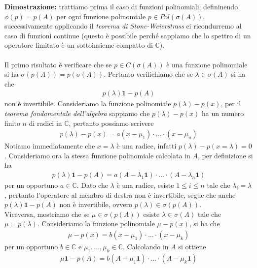 \documentclass{article}
\numberwithin{equation}{subsection}
\begin{document}
\textbf{Dimostrazione:} trattiamo prima il caso di funzioni polinomiali, defininendo $\phi(p) = p(A)$ per ogni funzione polinomiale $p \in Pol(\sigma(A))$, successivamente applicando il \textit{teorema di Stone-Weierstrass} ci ricondurremo al caso di funzioni continue (questo è possibile perché sappiamo che lo spettro di un operatore limitato è un sottoinsieme compatto di $\mathbb{C}$). \\ \\
Il primo risultato è verificare che se $p \in C(\sigma(A))$ è una funzione polinomiale si ha $\sigma(p(A)) = p(\sigma(A))$. Pertanto verifichiamo che se $\lambda \in \sigma(A)$ si ha che 
\begin{align*}
    p(\lambda)\mathbf{1} - p(A) 
\end{align*} 
non è invertibile. Consideriamo la funzione polinomiale $p(\lambda) - p(x)$, per il \textit{teorema fondamentale dell'algebra} sappiamo che $p(\lambda) - p(x)$ ha un numero finito $n$ di radici in $\mathbb{C}$, pertanto possiamo scrivere 
\begin{align*}
    p(\lambda) - p(x) = a(x - \mu_1) \cdot \dots \cdot (x - \mu_n) 
\end{align*}
Notiamo immediatamente che $x = \lambda$ è una radice, infatti $p(\lambda) - p(x = \lambda) = 0$. Consideriamo ora la stessa funzione polinomiale calcolata in $A$, per definizione si ha 
\begin{align*}
    p(\lambda)\mathbf{1} - p(A) = a(A - \lambda_1\mathbf{1}) \cdot \dots \cdot (A - \lambda_n\mathbf{1}) 
\end{align*}
per un opportuno $a \in \mathbb{C}$. Dato che $\lambda$ è una radice, esiste $1 \leq i \leq n$ tale che $\lambda_i = \lambda$, pertanto l'operatore al membro di destra non è invertibile, segue che anche $p(\lambda)\mathbf{1} - p(A)$ non è invertibile, ovvero $p(\lambda) \in \sigma(p(A))$. \\
Viceversa, mostriamo che se $\mu \in \sigma(p(A))$ esiste $\lambda \in \sigma(A)$ tale che $\mu = p(\lambda)$. Consideriamo la funzione polinomiale $\mu - p(x)$, si ha che 
\begin{align*}
    \mu - p(x) = b(x - \mu_1) \cdot \dots \cdot (x - \mu_k) 
\end{align*}
per un opportuno $b \in \mathbb{C}$ e $\mu_1, \dots, \mu_k \in \mathbb{C}$. Calcolando in $A$ si ottiene 
\begin{align*}
    \mu\mathbf{1} - p(A) = b(A - \mu_1\mathbf{1}) \cdot \dots \cdot (A - \mu_k\mathbf{1}) 
\end{align*}
\end{document}
